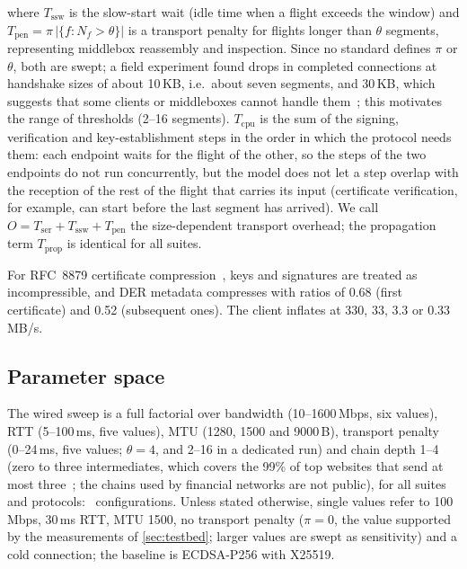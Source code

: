 \documentclass[preprint,12pt]{elsarticle}
\newcommand{\ms}{\,ms\xspace}
\newcommand{\KB}{\,KB\xspace}
\begin{document}
where $T_\text{ssw}$ is the slow-start wait (idle time when a flight exceeds the window) and $T_\text{pen}=\pi\,|\{f:N_f>\theta\}|$ is a transport penalty for flights longer than $\theta$ segments, representing middlebox reassembly and inspection. Since no standard defines $\pi$ or $\theta$, both are swept; a field experiment found drops in completed connections at handshake sizes of about 10\KB, i.e.\ about seven segments, and 30\KB, which suggests that some clients or middleboxes cannot handle them~\cite{westerbaan2021}; this motivates the range of thresholds (2--16 segments). $T_\text{cpu}$ is the sum of the signing, verification and key-establishment steps in the order in which the protocol needs them: each endpoint waits for the flight of the other, so the steps of the two endpoints do not run concurrently, but the model does not let a step overlap with the reception of the rest of the flight that carries its input (certificate verification, for example, can start before the last segment has arrived). We call $O=T_\text{ser}+T_\text{ssw}+T_\text{pen}$ the size-dependent transport overhead; the propagation term $T_\text{prop}$ is identical for all suites.

For RFC~8879 certificate compression~\cite{rfc8879}, keys and signatures are treated as incompressible, and DER metadata compresses with ratios of 0.68 (first certificate) and 0.52 (subsequent ones). The client inflates at 330, 33, 3.3 or 0.33\,MB/s.

\subsection{Parameter space}
The wired sweep is a full factorial over bandwidth (10--1600\,Mbps, six values), RTT (5--100\ms, five values), MTU (1280, 1500 and 9000\,B), transport penalty (0--24\ms, five values; $\theta=4$, and 2--16 in a dedicated run) and chain depth 1--4 (zero to three intermediates, which covers the 99\% of top websites that send at most three~\cite{kampanakis2022}; the chains used by financial networks are not public), for all suites and protocols: \nConfigs\ configurations. Unless stated otherwise, single values refer to 100\,Mbps, 30\ms RTT, MTU 1500, no transport penalty ($\pi=0$, the value supported by the measurements of \cref{sec:testbed}; larger values are swept as sensitivity) and a cold connection; the baseline is ECDSA-P256 with X25519.
\end{document}
